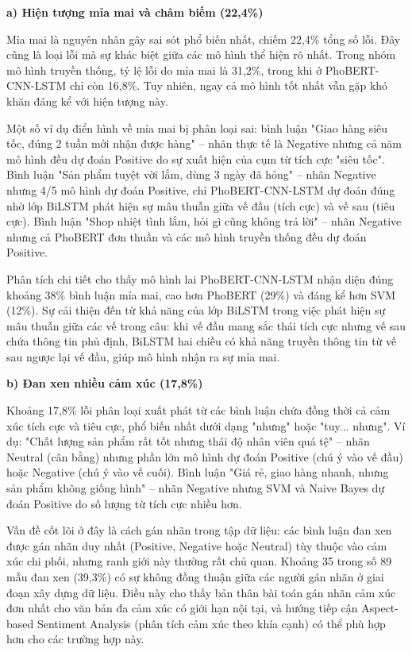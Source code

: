 \documentclass[14pt, a4paper]{report}
\begin{document}
\textbf{a) Hiện tượng mỉa mai và châm biếm (22,4\%)}


Mỉa mai là nguyên nhân gây sai sót phổ biến nhất, chiếm 22,4\% tổng số lỗi. Đây cũng là loại lỗi mà sự khác biệt giữa các mô hình thể hiện rõ nhất. Trong nhóm mô hình truyền thống, tỷ lệ lỗi do mỉa mai là 31,2\%, trong khi ở PhoBERT-CNN-LSTM chỉ còn 16,8\%. Tuy nhiên, ngay cả mô hình tốt nhất vẫn gặp khó khăn đáng kể với hiện tượng này.


Một số ví dụ điển hình về mỉa mai bị phân loại sai: bình luận "Giao hàng siêu tốc, đúng 2 tuần mới nhận được hàng" – nhãn thực tế là Negative nhưng cả năm mô hình đều dự đoán Positive do sự xuất hiện của cụm từ tích cực "siêu tốc". Bình luận "Sản phẩm tuyệt vời lắm, dùng 3 ngày đã hỏng" – nhãn Negative nhưng 4/5 mô hình dự đoán Positive, chỉ PhoBERT-CNN-LSTM dự đoán đúng nhờ lớp BiLSTM phát hiện sự mâu thuẫn giữa vế đầu (tích cực) và vế sau (tiêu cực). Bình luận "Shop nhiệt tình lắm, hỏi gì cũng không trả lời" – nhãn Negative nhưng cả PhoBERT đơn thuần và các mô hình truyền thống đều dự đoán Positive.


Phân tích chi tiết cho thấy mô hình lai PhoBERT-CNN-LSTM nhận diện đúng khoảng 38\% bình luận mỉa mai, cao hơn PhoBERT (29\%) và đáng kể hơn SVM (12\%). Sự cải thiện đến từ khả năng của lớp BiLSTM trong việc phát hiện sự mâu thuẫn giữa các vế trong câu: khi vế đầu mang sắc thái tích cực nhưng vế sau chứa thông tin phủ định, BiLSTM hai chiều có khả năng truyền thông tin từ vế sau ngược lại vế đầu, giúp mô hình nhận ra sự mỉa mai.


\textbf{b) Đan xen nhiều cảm xúc (17,8\%)}


Khoảng 17,8\% lỗi phân loại xuất phát từ các bình luận chứa đồng thời cả cảm xúc tích cực và tiêu cực, phổ biến nhất dưới dạng "nhưng" hoặc "tuy... nhưng". Ví dụ: "Chất lượng sản phẩm rất tốt nhưng thái độ nhân viên quá tệ" – nhãn Neutral (cân bằng) nhưng phần lớn mô hình dự đoán Positive (chú ý vào vế đầu) hoặc Negative (chú ý vào vế cuối). Bình luận "Giá rẻ, giao hàng nhanh, nhưng sản phẩm không giống hình" – nhãn Negative nhưng SVM và Naive Bayes dự đoán Positive do số lượng từ tích cực nhiều hơn.


Vấn đề cốt lõi ở đây là cách gán nhãn trong tập dữ liệu: các bình luận đan xen được gán nhãn duy nhất (Positive, Negative hoặc Neutral) tùy thuộc vào cảm xúc chi phối, nhưng ranh giới này thường rất chủ quan. Khoảng 35 trong số 89 mẫu đan xen (39,3\%) có sự không đồng thuận giữa các người gán nhãn ở giai đoạn xây dựng dữ liệu. Điều này cho thấy bản thân bài toán gán nhãn cảm xúc đơn nhất cho văn bản đa cảm xúc có giới hạn nội tại, và hướng tiếp cận Aspect-based Sentiment Analysis (phân tích cảm xúc theo khía cạnh) có thể phù hợp hơn cho các trường hợp này.
\end{document}
